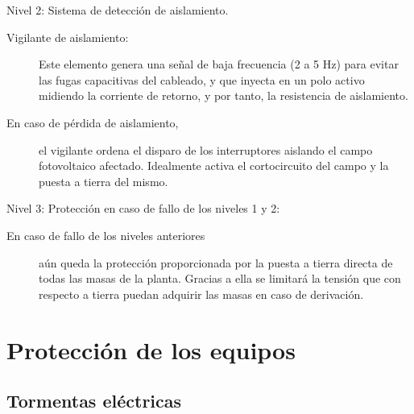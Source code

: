 \documentclass[aspectratio=169, usenames,svgnames,dvipsnames]{beamer}
\begin{document}
\begin{frame}[label={sec:org068a323}]{Nivel 2: Sistema de detección de aislamiento.}
\begin{description}
\item[{Vigilante de aislamiento:}] Este elemento genera una señal de baja
frecuencia (2 a 5 Hz) para evitar las fugas capacitivas del cableado,
y que inyecta en un polo activo midiendo la corriente de retorno, y
por tanto, la resistencia de aislamiento.

\item[{En caso de pérdida de aislamiento,}] el vigilante ordena el
disparo de los interruptores aislando el campo fotovoltaico
afectado. Idealmente activa el cortocircuito del campo y la puesta a
tierra del mismo.
\end{description}
\end{frame}

\begin{frame}[label={sec:org71e3f89}]{Nivel 3: Protección en caso de fallo de los niveles 1 y 2:}
\begin{description}
\item[{En caso de fallo de los niveles anteriores}] aún queda la
protección proporcionada por la puesta a tierra directa de todas las
masas de la planta. Gracias a ella se limitará la tensión que con
respecto a tierra puedan adquirir las masas en caso de derivación.
\end{description}
\end{frame}



\section{Protección de los equipos}
\label{sec:org1bf9ebe}

\subsection{Tormentas eléctricas}
\label{sec:org391965a}
\end{document}
